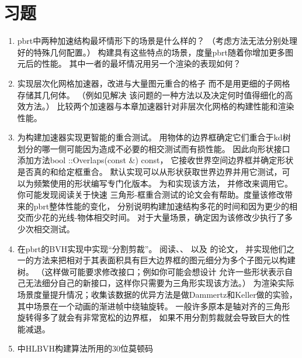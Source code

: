 \section{习题}\label{sec:习题04}

\begin{enumerate}
    \item \circletwo pbrt中两种加速结构最坏情形下的场景是什么样的？
          （考虑方法无法分别处理好的特殊几何配置。）
          构建具有这些特点的场景，度量pbrt随着你增加更多图元后的性能。
          其中一者的最坏情况用另一个渲染的表现如何？
    \item \circletwo 实现层次化网格加速器，改进与大量图元重合的格子
          而不是用更细的子网格存储其几何体。
          （例如见\citet{Jevans1989:23}解决
          该问题的一种方法以及\citet{4342587}决定何时值得细化的高效方法。）
          比较两个加速器与本章加速器针对非层次化网格的构建性能和渲染性能。
    \item \circletwo 为构建加速器实现更智能的重合测试。
          用物体的边界框确定它们重合于kd树划分的哪一侧可能因为造成不必要的相交测试而有损性能。
          因此向形状接口添加方法{\ttfamily bool ::Overlaps(const  \&) const}，
          它接收世界空间边界框并确定形状是否真的和给定框重合。
          默认实现可以从形状获取世界边界并用它测试，可以为频繁使用的形状编写专门化版本。
          为和实现该方法，
          并修改来调用它。
          你可能发现阅读\citet{doi:10.1080/10867651.2001.10487535}关于快速
          三角形-框重合测试的论文会有帮助。度量该修改带来的pbrt整体性能的变化，
          分别说明构建加速结构多花的时间和因为更少的相交而少花的光线-物体相交时间。
          对于大量场景，确定因为该修改少执行了多少次相交测试。
    \item \circletwo 在pbrt的BVH实现中实现“分割剪裁”。
          阅读\citet{4342593}、\citet{4634636}、
          \citet{10.1145/1572769.1572771}以及
          \citet{10.1145/2492045.2492055}的论文，
          并实现他们之一的方法来把相对于其表面积具有巨大边界框的图元细分为多个子图元以构建树。
          （这样做可能要求修改接口；例如你可能会想设计
          允许一些形状表示自己无法细分自己的新接口，这样你只需要为三角形实现该方法。）
          为渲染实际场景度量提升情况；收集该数据的优异方法是做Dammertz和Keller做的实验，
          其中场景在一个动画的渐进帧中绕轴旋转。
          一般许多原本是轴对齐的三角形旋转得多了就会有非常宽松的边界框，
          如果不用分割剪裁就会导致巨大的性能减退。
    \item \circletwo {}中HLBVH构建算法所用的30位莫顿码

\end{enumerate}
